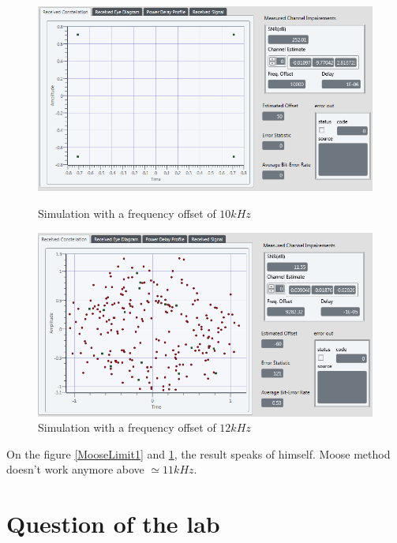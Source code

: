\documentclass[frenchb, oneside, headings=normal]{scrartcl}
\begin{document}
\begin{figure}[!ht]
    \begin{minipage}[b]{0.48\linewidth}
        \centering \includegraphics[scale=0.45]{img/test_Offset_10k_OK_limitMooseCheck.png}
     \caption{Simulation with a frequency offset of $10 kHz$}
     \label{MooseLimit1}
    \end{minipage}\hfill
    \begin{minipage}[b]{0.48\linewidth}
         \centering \includegraphics[scale=0.45]{img/test_Offset_12k_OK_limitMooseCheck.png}
\caption{Simulation with a frequency offset of $12 kHz$}
 \label{MooseLimit2}
    \end{minipage}
\end{figure}

On the figure \ref{MooseLimit1} and \ref{MooseLimit2}, the result speaks of himself. Moose method doesn't work anymore above $\simeq 11 kHz$.


\section{Question of the lab}
\end{document}
